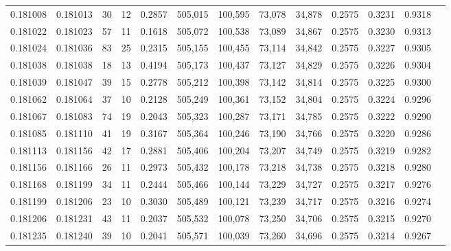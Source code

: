 \begin{tabular}{rrrrrrrrrrrrr}
0.181008 & 0.181013 &    30 &  12 &                                     0.2857 & 505,015 & 100,595 &  73,078 &  34,878 & 0.2575 & 0.3231 & 0.9318 \\
0.181022 & 0.181023 &    57 &  11 &                                     0.1618 & 505,072 & 100,538 &  73,089 &  34,867 & 0.2575 & 0.3230 & 0.9313 \\
0.181024 & 0.181036 &    83 &  25 &                                     0.2315 & 505,155 & 100,455 &  73,114 &  34,842 & 0.2575 & 0.3227 & 0.9305 \\
0.181038 & 0.181038 &    18 &  13 &                                     0.4194 & 505,173 & 100,437 &  73,127 &  34,829 & 0.2575 & 0.3226 & 0.9304 \\
0.181039 & 0.181047 &    39 &  15 &                                     0.2778 & 505,212 & 100,398 &  73,142 &  34,814 & 0.2575 & 0.3225 & 0.9300 \\
0.181062 & 0.181064 &    37 &  10 &                                     0.2128 & 505,249 & 100,361 &  73,152 &  34,804 & 0.2575 & 0.3224 & 0.9296 \\
0.181067 & 0.181083 &    74 &  19 &                                     0.2043 & 505,323 & 100,287 &  73,171 &  34,785 & 0.2575 & 0.3222 & 0.9290 \\
0.181085 & 0.181110 &    41 &  19 &                                     0.3167 & 505,364 & 100,246 &  73,190 &  34,766 & 0.2575 & 0.3220 & 0.9286 \\
0.181113 & 0.181156 &    42 &  17 &                                     0.2881 & 505,406 & 100,204 &  73,207 &  34,749 & 0.2575 & 0.3219 & 0.9282 \\
0.181156 & 0.181166 &    26 &  11 &                                     0.2973 & 505,432 & 100,178 &  73,218 &  34,738 & 0.2575 & 0.3218 & 0.9280 \\
0.181168 & 0.181199 &    34 &  11 &                                     0.2444 & 505,466 & 100,144 &  73,229 &  34,727 & 0.2575 & 0.3217 & 0.9276 \\
0.181199 & 0.181206 &    23 &  10 &                                     0.3030 & 505,489 & 100,121 &  73,239 &  34,717 & 0.2575 & 0.3216 & 0.9274 \\
0.181206 & 0.181231 &    43 &  11 &                                     0.2037 & 505,532 & 100,078 &  73,250 &  34,706 & 0.2575 & 0.3215 & 0.9270 \\
0.181235 & 0.181240 &    39 &  10 &                                     0.2041 & 505,571 & 100,039 &  73,260 &  34,696 & 0.2575 & 0.3214 & 0.9267 \\

\end{tabular}
